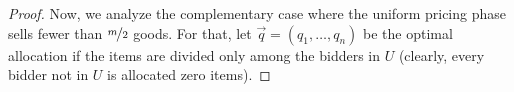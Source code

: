 \begin{proof}


Now, we analyze the complementary case 
where the uniform pricing phase sells fewer than $\nicefrac{m}{2}$ goods. For that, let $\vec{q}=(q_1,\dots,q_n)$ be the optimal allocation if the items are divided only among the bidders in $U$ (clearly, every bidder not in $U$ is allocated zero items).  


\end{proof}
